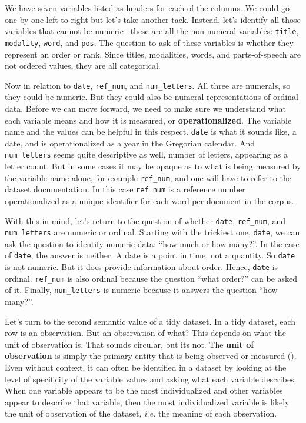 \documentclass[
  letterpaper,
  DIV=11,
  numbers=noendperiod]{scrreprt}
\theoremstyle{definition}
\theoremstyle{remark}
\begin{document}
We have seven variables listed as headers for each of the columns. We
could go one-by-one left-to-right but let's take another tack. Instead,
let's identify all those variables that cannot be numeric --these are
all the non-numeral variables: \texttt{title}, \texttt{modality},
\texttt{word}, and \texttt{pos}. The question to ask of these variables
is whether they represent an order or rank. Since titles, modalities,
words, and parts-of-speech are not ordered values, they are all
categorical.

Now in relation to \texttt{date}, \texttt{ref\_num}, and
\texttt{num\_letters}. All three are numerals, so they could be numeric.
But they could also be numeral representations of ordinal data. Before
we can move forward, we need to make sure we understand what each
variable means and how it is measured, or \textbf{operationalized}. The
variable name and the values can be helpful in this respect.
\texttt{date} is what it sounds like, a date, and is operationalized as
a year in the Gregorian calendar. And \texttt{num\_letters} seems quite
descriptive as well, number of letters, appearing as a letter count. But
in some cases it may be opaque as to what is being measured by the
variable name alone, for example \texttt{ref\_num}, and one will have to
refer to the dataset documentation. In this case \texttt{ref\_num} is a
reference number operationalized as a unique identifier for each word
per document in the corpus.

With this in mind, let's return to the question of whether
\texttt{date}, \texttt{ref\_num}, and \texttt{num\_letters} are numeric
or ordinal. Starting with the trickiest one, \texttt{date}, we can ask
the question to identify numeric data: ``how much or how many?''. In the
case of \texttt{date}, the answer is neither. A date is a point in time,
not a quantity. So \texttt{date} is not numeric. But it does provide
information about order. Hence, \texttt{date} is ordinal.
\texttt{ref\_num} is also ordinal because the question ``what order?''
can be asked of it. Finally, \texttt{num\_letters} is numeric because it
answers the question ``how many?''.

Let's turn to the second semantic value of a tidy dataset. In a tidy
dataset, each row is an observation. But an observation of what? This
depends on what the unit of observation is. That sounds circular, but
its not. The \textbf{unit of observation} is simply the primary entity
that is being observed or measured (). Even without context, it can often be identified in a dataset by
looking at the level of specificity of the variable values and asking
what each variable describes. When one variable appears to be the most
individualized and other variables appear to describe that variable,
then the most individualized variable is likely the unit of observation
of the dataset, \emph{i.e.} the meaning of each observation.
\end{document}
